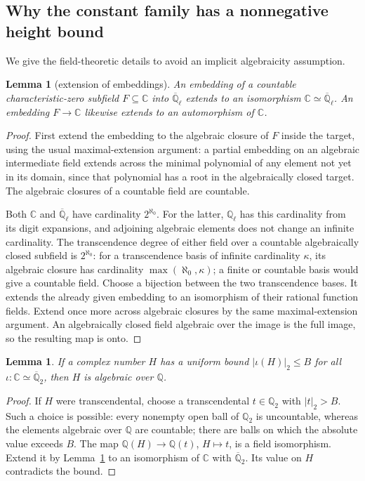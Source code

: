 \documentclass[11pt,a4paper]{article}
\newtheorem{lemma}[theorem]{Lemma}
\theoremstyle{definition}
\newcommand{\C}{\mathbb C}
\newcommand{\Q}{\mathbb Q}
\newcommand{\abs}[1]{\left|#1\right|}
\begin{document}
\subsection{Why the constant family has a nonnegative height bound}
We give the field-theoretic details to avoid an implicit algebraicity assumption.

\begin{lemma}[extension of embeddings]\label{lem:extend}
An embedding of a countable characteristic-zero subfield \(F\subseteq\C\)
into \(\overline{\Q}_\ell\) extends to an isomorphism
\(\C\simeq\overline{\Q}_\ell\).
An embedding \(F\to\C\) likewise extends to an automorphism of \(\C\).
\end{lemma}
\begin{proof}
First extend the embedding to the algebraic closure of \(F\) inside the
target, using the usual maximal-extension argument: a partial embedding
on an algebraic intermediate field extends across the minimal polynomial
of any element not yet in its domain, since that polynomial has a root
in the algebraically closed target. The algebraic closures of a countable
field are countable.

Both \(\C\) and \(\overline{\Q}_\ell\) have cardinality \(2^{\aleph_0}\).
For the latter, \(\Q_\ell\) has this cardinality from its digit expansions,
and adjoining algebraic elements does not change an infinite cardinality.
The transcendence degree of either field over a countable algebraically
closed subfield is \(2^{\aleph_0}\): for a transcendence basis of infinite
cardinality \(\kappa\), its algebraic closure has cardinality
\(\max(\aleph_0,\kappa)\); a finite or countable basis would give a countable
field. Choose a bijection between the two transcendence bases.
It extends the already given embedding to an isomorphism of their rational
function fields. Extend once more across algebraic closures by the same
maximal-extension argument. An algebraically closed field algebraic over
the image is the full image, so the resulting map is onto.
\end{proof}

\begin{lemma}\label{lem:algebraic}
If a complex number \(H\) has a uniform bound
\(\abs{\iota(H)}_2\le B\) for all \(\iota:\C\simeq\overline{\Q}_2\),
then \(H\) is algebraic over \(\Q\).
\end{lemma}
\begin{proof}
If \(H\) were transcendental, choose a transcendental \(t\in\Q_2\) with
\(\abs t_2>B\). Such a choice is possible: every nonempty open ball of
\(\Q_2\) is uncountable, whereas the elements algebraic over \(\Q\) are
countable; there are balls on which the absolute value exceeds \(B\).
The map \(\Q(H)\to\Q(t)\), \(H\mapsto t\), is a field isomorphism.
Extend it by Lemma~\ref{lem:extend} to an isomorphism of \(\C\) with
\(\overline{\Q}_2\). Its value on \(H\) contradicts the bound.
\end{proof}
\end{document}
